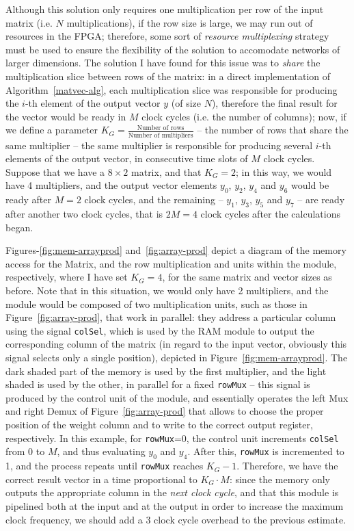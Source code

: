 Although this solution only requires one multiplication per row of the input matrix (i.e. $N$ multiplications), if the row size is large, we may run out of resources in the FPGA; therefore, some sort of \textit{resource multiplexing} strategy must be used to ensure the flexibility of the solution to accomodate networks of larger dimensions. The solution I have found for this issue was to \emph{share} the multiplication slice between rows of the matrix: in a direct implementation of Algorithm~\ref{matvec-alg}, each multiplication slice was responsible for producing the $i$-th element of the output vector $y$ (of size $N$), therefore the final result for the vector would be ready in $M$ clock cycles (i.e. the number of columns); now, if we define a parameter $K_G = \frac{\text{Number of rows}}{\text{Number of multipliers}}$ -- the number of rows that share the same multiplier -- the same multiplier is responsible for producing several $i$-th elements of the output vector, in consecutive time slots of $M$ clock cycles. Suppose that we have a $8\times2$ matrix, and that $K_G = 2$; in this way, we would have 4 multipliers, and the output vector elements $y_0$, $y_2$, $y_4$ and $y_6$ would be ready after $M=2$ clock cycles, and the remaining -- $y_1$, $y_3$, $y_5$ and $y_7$ --  are ready after another two clock cycles, that is $2M = 4$ clock cycles after the calculations began. 

Figures-\ref{fig:mem-arrayprod} and~\ref{fig:array-prod} depict a diagram of the memory access for the Matrix, and the row multiplication and units within the module, respectively, where I have set $K_G = 4$, for the same matrix and vector sizes as before. Note that in this situation, we would only have 2 multipliers, and the module would be composed of two multiplication units, such as those in Figure~\ref{fig:array-prod}, that work in parallel: they address a particular column using the signal \verb+colSel+, which is used by the RAM module to output the corresponding column of the matrix (in regard to the input vector, obviously this signal selects only a single position), depicted in Figure~\ref{fig:mem-arrayprod}. The dark shaded part of the memory is used by the first multiplier, and the light shaded is used by the other, in parallel for a fixed \verb+rowMux+ -- this signal is produced by the control unit of the module, and essentially operates the left Mux and right Demux of Figure~\ref{fig:array-prod} that allows to choose the proper position of the weight column and to write to the correct output register, respectively. In this example, for \verb+rowMux+=0, the control unit increments \verb+colSel+ from 0 to $M$, and thus evaluating $y_0$ and $y_4$. After this, \verb+rowMux+ is incremented to 1, and the process repeats until \verb+rowMux+ reaches $K_G-1$. Therefore, we have the correct result vector in a time proportional to $K_G \cdot M$: since the memory only outputs the appropriate column in the \emph{next clock cycle}, and that this module is pipelined both at the input and at the output in order to increase the maximum clock frequency, we should add a 3 clock cycle overhead to the previous estimate. 

